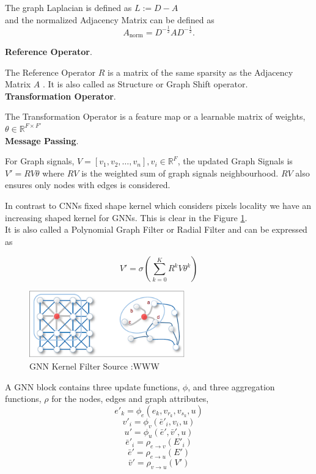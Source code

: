 \documentclass{report} %
\begin{document}
The graph Laplacian is defined as \( L := D - A \) \\
and the normalized Adjacency Matrix can be defined as
\[
A_{\text{norm}} = D^{-\frac{1}{2}} A D^{-\frac{1}{2}}.
\]

\textbf{Reference Operator}.

The Reference Operator  \( R \) is a matrix of the same sparsity as the Adjacency Matrix \( A \) .
It is also called as Structure or Graph Shift operator.\\

\textbf{Transformation Operator}.

The Transformation Operator is a feature map or a learnable matrix of weights, \( \theta \in \mathbb{R}^{F \times F'} \)\\

\textbf{Message Passing}. 

For Graph signals, \( V = [v_1, v_2, \dots, v_n], v_i  \in \mathbb{R}^F \), the updated Graph Signals is \( V' = RV\theta \) 
where \( RV \) is the weighted sum of graph signals neighbourhood. \( RV \) also ensures only nodes with edges is considered.

In contrast to \ac{CNN}s fixed shape kernel which considers pixels locality we have an increasing shaped kernel for \ac{GNN}s.
This is clear in the Figure \ref{fig:GNN Kernel Filter}.\\
It is also called a Polynomial Graph Filter or Radial Filter and can be expressed as

\[ V' = \sigma (\sum_{k=0}^{K}R^{k}V\theta^{k}) \]

\begin{figure}[H]
    \centering
    \includegraphics[width=0.6\textwidth]{./ReportImages/GNNKernel.png} 
    \caption{\ac{GNN} Kernel Filter Source :WWW}
    \label{fig:GNN Kernel Filter}
\end{figure}

A \ac{GNN} block contains three update functions, \( \phi \), and three aggregation functions, \( \rho \) for the nodes, edges and graph attributes, \cite{GNNs-2018}
\[
e'_k = \phi_e(e_k, v_{r_k}, v_{s_k}, u)
\]
\[
v'_i = \phi_v(\bar{e}'_i, v_i, u)
\]
\[
u' = \phi_u(\bar{e}', \bar{v}', u)
\]
\[
\bar{e}'_i = \rho_{e \to v}(E'_i)
\]
\[
\bar{e}' = \rho_{e \to u}(E')
\]
\[
\bar{v}' = \rho_{v \to u}(V')
\]
\end{document}
